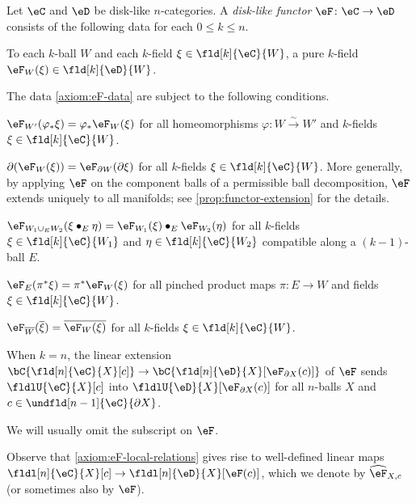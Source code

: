 \documentclass[12pt,reqno]{amsart}
\newcommand{\C}{\eC}
\newcommand{\D}{\eD}
\newcommand{\blt}{\bullet}
\newcommand{\fcj}[1]{\overline{#1}}
\newcommand{\orev}{\overline}
\newcommand{\defn}[1]{\emph{#1}}
\begin{document}
\begin{definition}
\label{def: DL functor}
Let $\C$ and $\D$ be disk-like $n$-categories.
A \defn{disk-like functor} $\eF\colon\C\to\D$ consists of the following data for each $0\leq k\leq n$.
\begin{lst}
\item[(D$\eF$)]\label{axiom:eF-data}
To each $k$-ball $W$ and each $k$-field $\xi\in\fld[k]{\C}{W}$, a pure $k$-field $\eF_W(\xi)\in\fld[k]{\D}{W}$.
\end{lst}
The data \ref{axiom:eF-data} are subject to the following conditions.
\begin{lst}
\item[($\eF\varphi$)]\label{axiom:eF-nat}
$\eF_{W'}(\varphi_*\xi)=\varphi_*\eF_W(\xi)$ for all homeomorphisms $\varphi\colon W\xrightarrow{\sim} W'$ and $k$-fields $\xi\in\fld[k]{\C}{W}$.
\item[($\eF\partial$)]\label{axiom:eF-boundary} 
$\partial(\eF_W(\xi)) = \eF_{\partial W}(\partial \xi)$ for all $k$-fields $\xi\in\fld[k]{\C}{W}$. More generally, by applying $\eF$ on the component balls of a permissible ball decomposition, $\eF$ extends uniquely to all manifolds; see \cref{prop:functor-extension} for the details.
\item[($\eF$G)]\label{axiom:eF-gluing} 
$\eF_{W_1\cup_E W_2}(\xi\blt_E \eta) = \eF_{W_1}(\xi)\blt_E \eF_{W_2}(\eta)$ for all $k$-fields $\xi\in\fld[k]{\C}{W_1}$ and $\eta\in\fld[k]{\C}{W_2}$ compatible along a $(k-1)$-ball $E$.
\item[($\eF\pi$)]\label{axiom:eF-products} 
$\eF_E(\pi^* \xi) = \pi^* \eF_W(\xi)$ for all pinched product maps $\pi \colon E \to W$ and fields $\xi \in \fld[k]{\C}{W}$.
\item[($\eF\kern.2ex\fcj{\,\cdot\,}$)]\label{axiom:eF-refl}
$\eF_{\orev{W}}(\fcj{\xi}) = \fcj{\eF_W(\xi)}$ for all $k$-fields $\xi\in\fld[k]{\C}{W}$.
\item[($\eF$U)]\label{axiom:eF-local-relations} 
When $k=n$, the linear extension $\bC\{\fld[n]{\C}{X}[ c]\} \to \bC\{\fld[n]{\D}{X}[ \eF_{\partial X}(c)]\}$ of $\eF$ sends $\fldlU{\C}{X}[c]$ into $\fldlU{\D}{X}[ \eF_{\partial X}(c)]$ for all $n$-balls $X$ and $c\in\undfld[n-1]{\C}{\partial X}$.
\end{lst}
We will usually omit the subscript on $\eF$.

Observe that \ref{axiom:eF-local-relations} gives rise to well-defined linear maps $\fldl[n]{\C}{X}[c]\to\fldl[n]{\D}{X}[\eF(c)]$, which we denote by $\widehat\eF_{X,c}$ (or sometimes also by $\eF$).
\end{definition}
\end{document}
